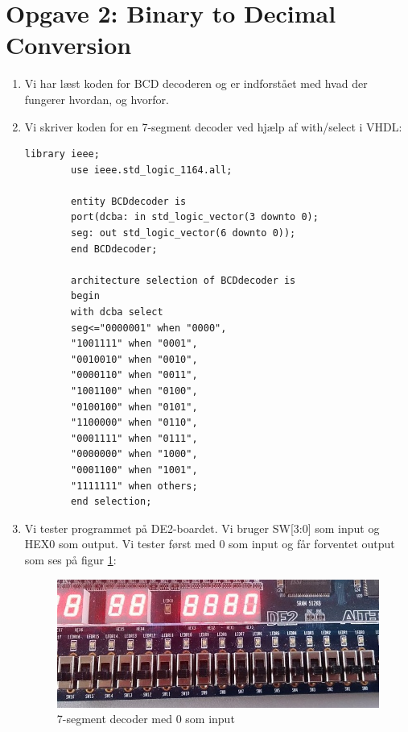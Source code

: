 \section{Opgave 2: Binary to Decimal Conversion}
\begin{enumerate}
	\item[1)]
	Vi har læst koden for BCD decoderen og er indforstået med hvad der fungerer hvordan, og hvorfor.\newline
	
	\item[2)]
	Vi skriver koden for en 7-segment decoder ved hjælp af with/select i VHDL:\\
		\begin{lstlisting}[caption={BCD til 7 segment decoder},label={lst:bcdTo7SegDecoder}]
		library ieee;
		use ieee.std_logic_1164.all;
		
		entity BCDdecoder is
		port(dcba: in std_logic_vector(3 downto 0);
		seg: out std_logic_vector(6 downto 0));
		end BCDdecoder;
		
		architecture selection of BCDdecoder is
		begin
		with dcba select
		seg<="0000001" when "0000",
		"1001111" when "0001",
		"0010010" when "0010",
		"0000110" when "0011",
		"1001100" when "0100",
		"0100100" when "0101",
		"1100000" when "0110",
		"0001111" when "0111",
		"0000000" when "1000",
		"0001100" when "1001",
		"1111111" when others;
		end selection;	
		\end{lstlisting}
		
\item[3)]
	Vi tester programmet på DE2-boardet. Vi bruger SW[3:0] som input og HEX0 som output. Vi tester først med 0 som input og får forventet output som ses på figur \ref{fig:7SegDecoder0}:
	\begin{figure}[h]
		\centering
		\includegraphics[scale=0.6]{pictures/Oevelse4/BCD_decoder/BCD_1seg_0.jpg}
		\caption{7-segment decoder med 0 som input}
		\label{fig:7SegDecoder0}
	\end{figure}


\end{enumerate}
